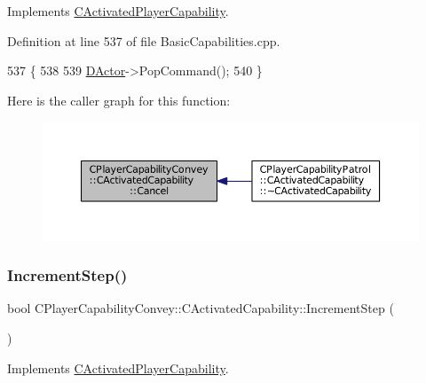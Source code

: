 Implements \hyperlink{classCActivatedPlayerCapability_a5cde83be468e262ad054d81e28684a81}{C\+Activated\+Player\+Capability}.



Definition at line 537 of file Basic\+Capabilities.\+cpp.


\begin{DoxyCode}
537                                                         \{
538 
539     \hyperlink{classCActivatedPlayerCapability_a54ca944b47bff2718330639941d402b0}{DActor}->PopCommand();
540 \}
\end{DoxyCode}
Here is the caller graph for this function\+:
\nopagebreak
\begin{figure}[H]
\begin{center}
\leavevmode
\includegraphics[width=350pt]{classCPlayerCapabilityConvey_1_1CActivatedCapability_ad84a94a1ae3647ea160e262a0154e229_icgraph}
\end{center}
\end{figure}
\hypertarget{classCPlayerCapabilityConvey_1_1CActivatedCapability_ac1bf251eca552885041b1bcefa594591}{}\label{classCPlayerCapabilityConvey_1_1CActivatedCapability_ac1bf251eca552885041b1bcefa594591} 
\subsubsection{\texorpdfstring{Increment\+Step()}{IncrementStep()}}
{\footnotesize\ttfamily bool C\+Player\+Capability\+Convey\+::\+C\+Activated\+Capability\+::\+Increment\+Step (\begin{DoxyParamCaption}{ }\end{DoxyParamCaption})\hspace{0.3cm}{\ttfamily [virtual]}}



Implements \hyperlink{classCActivatedPlayerCapability_a943b5999a57504399293250382c0ec6a}{C\+Activated\+Player\+Capability}.



